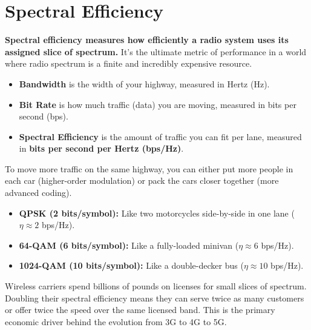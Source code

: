 
\chapter{Spectral Efficiency}
\label{ch:spectral-efficiency}

\begin{nontechnical}
    \textbf{Spectral efficiency measures how efficiently a radio system uses its assigned slice of spectrum.} It's the ultimate metric of performance in a world where radio spectrum is a finite and incredibly expensive resource.

    \begin{itemize}
        \item \textbf{Bandwidth} is the width of your highway, measured in Hertz (Hz).
        \item \textbf{Bit Rate} is how much traffic (data) you are moving, measured in bits per second (bps).
        \item \textbf{Spectral Efficiency} is the amount of traffic you can fit per lane, measured in \textbf{bits per second per Hertz (bps/Hz)}.
    \end{itemize}

    To move more traffic on the same highway, you can either put more people in each car (higher-order modulation) or pack the cars closer together (more advanced coding).
    \begin{itemize}
        \item \textbf{QPSK (2 bits/symbol):} Like two motorcycles side-by-side in one lane ($\eta \approx 2$ bps/Hz).
        \item \textbf{64-QAM (6 bits/symbol):} Like a fully-loaded minivan ($\eta \approx 6$ bps/Hz).
        \item \textbf{1024-QAM (10 bits/symbol):} Like a double-decker bus ($\eta \approx 10$ bps/Hz).
    \end{itemize}

    Wireless carriers spend billions of pounds on licenses for small slices of spectrum. Doubling their spectral efficiency means they can serve twice as many customers or offer twice the speed over the same licensed band. This is the primary economic driver behind the evolution from 3G to 4G to 5G.
\end{nontechnical}


